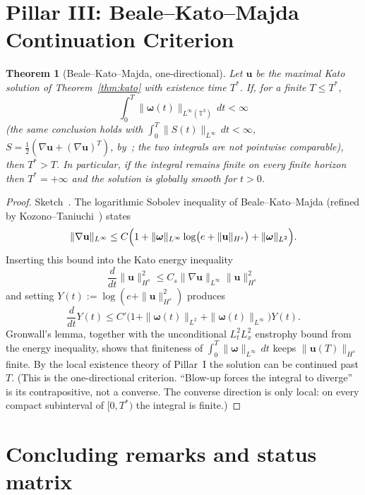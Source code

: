 \documentclass[11pt,a4paper]{article}
\newtheorem{theorem}{Theorem}[section]
\begin{document}
\section{Pillar III: Beale--Kato--Majda Continuation Criterion}

\begin{theorem}[Beale--Kato--Majda, one-directional]\label{thm:bkm}
Let \(\mathbf{u}\) be the maximal Kato solution of Theorem~\ref{thm:kato} with existence time \(T^*\). If, for a finite \(T\le T^*\),
\[
\int_0^{T}\|\boldsymbol{\omega}(t)\|_{L^\infty(\mathbb{T}^3)}\,dt<\infty
\]
(the same conclusion holds with \(\int_0^{T}\|S(t)\|_{L^\infty}\,dt<\infty\), \(S=\frac12(\nabla\mathbf{u}+(\nabla\mathbf{u})^T)\), by~\cite{Ponce1985}; the two integrals are not pointwise comparable), then \(T^*>T\). In particular, if the integral remains finite on every finite horizon then \(T^*=+\infty\) and the solution is globally smooth for \(t>0\).
\end{theorem}

\begin{proof}
Sketch~\cite{BKM1984}. The logarithmic Sobolev inequality of Beale--Kato--Majda (refined by Kozono--Taniuchi~\cite{KozonoTaniuchi2000}) states
\[
\|\nabla\mathbf{u}\|_{L^\infty}\le C\Bigl(1+\|\boldsymbol{\omega}\|_{L^\infty}\log\bigl(e+\|\mathbf{u}\|_{H^s}\bigr)+\|\boldsymbol{\omega}\|_{L^2}\Bigr).
\]
Inserting this bound into the Kato energy inequality
\[
\frac{d}{dt}\|\mathbf{u}\|_{H^s}^2\le C_s\|\nabla\mathbf{u}\|_{L^\infty}\|\mathbf{u}\|_{H^s}^2
\]
and setting \(Y(t):=\log(e+\|\mathbf{u}\|_{H^s}^2)\) produces
\[
\frac{d}{dt}Y(t)\le C'\bigl(1+\|\boldsymbol{\omega}(t)\|_{L^2}+\|\boldsymbol{\omega}(t)\|_{L^\infty}\bigr)Y(t).
\]
Gronwall's lemma, together with the unconditional \(L^2_t L^2_x\) enstrophy bound from the energy inequality, shows that finiteness of \(\int_0^T\|\boldsymbol{\omega}\|_{L^\infty}\,dt\) keeps \(\|\mathbf{u}(T)\|_{H^s}\) finite. By the local existence theory of Pillar~I the solution can be continued past \(T\). (This is the one-directional criterion. ``Blow-up forces the integral to diverge'' is its contrapositive, not a converse. The converse direction is only local: on every compact subinterval of \([0,T^*)\) the integral is finite.)
\end{proof}

\section{Concluding remarks and status matrix}
\end{document}
